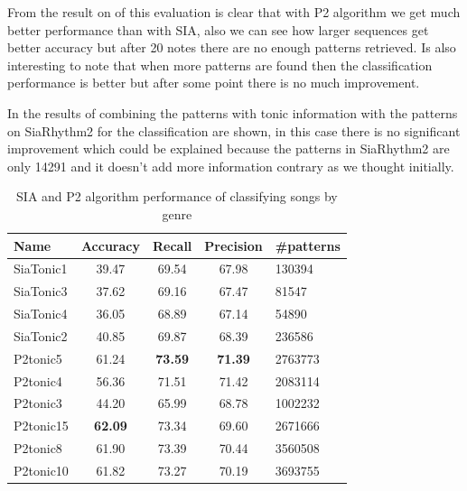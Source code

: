 \documentclass{article}
\begin{document}
From the result on  of this evaluation is clear that with P2 algorithm we get much better performance than with SIA, also we can see how larger sequences get better accuracy but after 20 notes there are no enough patterns retrieved. Is also interesting to note that when more patterns are found then the classification performance is better but after some point there is no much improvement. 

In  the results of combining the patterns with tonic information with the patterns on SiaRhythm2 for the classification are shown, in this case there is no significant improvement which could be explained because the patterns in SiaRhythm2 are only 14291 and it doesn't add more information contrary as we thought initially.  

\begin{table}
 \begin{center}
 \begin{tabular}{|l|c|c|c|p{1.2cm}|}
  \hline
  Name & Accuracy & Recall& Precision& \#patterns\\
  \hline
  SiaTonic1 & 39.47 & 69.54 & 67.98 & 130394 \\
  \hline
  SiaTonic3 & 37.62 & 69.16 & 67.47 & 81547 \\
  \hline
  SiaTonic4 & 36.05 & 68.89 & 67.14 & 54890  \\
  \hline
  SiaTonic2 & 40.85 & 69.87 & 68.39 & 236586 \\
  \hline
  P2tonic5 & 61.24 & \textbf{73.59} & \textbf{71.39} & 2763773 \\
  \hline
  P2tonic4 & 56.36 & 71.51 & 71.42 & 2083114 \\
  \hline
  P2tonic3 & 44.20 & 65.99 & 68.78 & 1002232 \\
  \hline
  P2tonic15 & \textbf{62.09} & 73.34 & 69.60 & 2671666 \\
  \hline
  P2tonic8 & 61.90 & 73.39 & 70.44 & 3560508 \\
  \hline
  P2tonic10 & 61.82 & 73.27 & 70.19 & 3693755 \\
  \hline
 \end{tabular}
\end{center}
 \caption{SIA and P2 algorithm performance of classifying songs by genre}
 \label{tonic_results}
\end{table}
\end{document}
